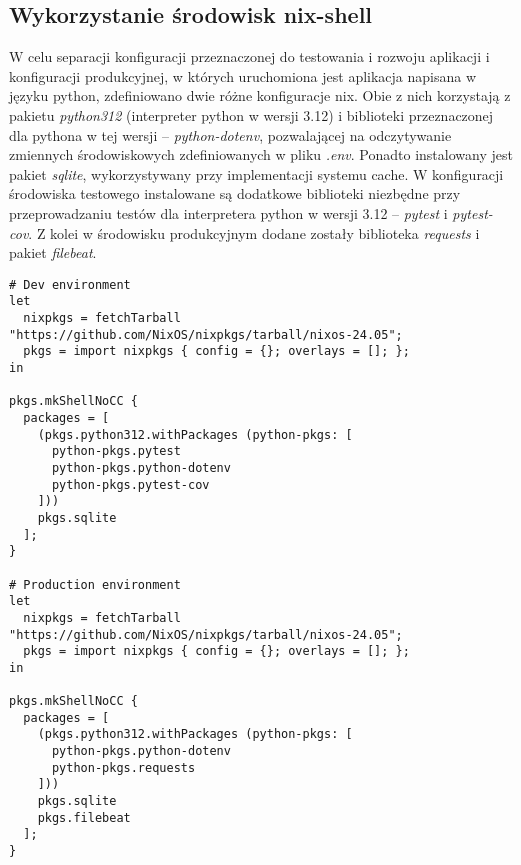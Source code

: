 \subsection{Wykorzystanie środowisk nix-shell}
W celu separacji konfiguracji przeznaczonej do testowania i rozwoju aplikacji i konfiguracji produkcyjnej, w których uruchomiona jest aplikacja napisana w języku python, zdefiniowano dwie różne konfiguracje nix. Obie z nich korzystają z pakietu \textit{python312} (interpreter python w wersji 3.12) i biblioteki przeznaczonej dla pythona w tej wersji -- \textit{python-dotenv}, pozwalającej na odczytywanie zmiennych środowiskowych zdefiniowanych w pliku \textit{.env}. Ponadto instalowany jest pakiet \textit{sqlite}, wykorzystywany przy implementacji systemu cache.
\newline \noindent W konfiguracji środowiska testowego instalowane są dodatkowe biblioteki niezbędne przy przeprowadzaniu testów dla interpretera python w wersji 3.12 -- \textit{pytest} i \textit{pytest-cov}. Z kolei w środowisku produkcyjnym dodane zostały biblioteka \textit{requests} i pakiet \textit{filebeat}.
\begin{lstlisting}[caption = {Porównanie środowisk nix dla środowiska testowego i środowiska produkcyjnego}]
# Dev environment
let
  nixpkgs = fetchTarball "https://github.com/NixOS/nixpkgs/tarball/nixos-24.05";
  pkgs = import nixpkgs { config = {}; overlays = []; };
in

pkgs.mkShellNoCC {
  packages = [
    (pkgs.python312.withPackages (python-pkgs: [
      python-pkgs.pytest
      python-pkgs.python-dotenv
      python-pkgs.pytest-cov
    ]))
    pkgs.sqlite
  ];
}

# Production environment
let
  nixpkgs = fetchTarball "https://github.com/NixOS/nixpkgs/tarball/nixos-24.05";
  pkgs = import nixpkgs { config = {}; overlays = []; };
in

pkgs.mkShellNoCC {
  packages = [
    (pkgs.python312.withPackages (python-pkgs: [
      python-pkgs.python-dotenv
      python-pkgs.requests
    ]))
    pkgs.sqlite
    pkgs.filebeat
  ];
}
\end{lstlisting}
